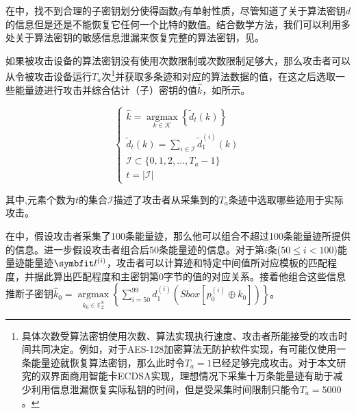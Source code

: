 {	\begin{example}
		在中，找不到合理的子密钥划分使得函数$g$有单射性质，尽管知道了关于算法密钥$d$的信息但是还是不能恢复它任何一个比特的数值。结合数学方法，我们可以利用多处关于算法密钥的敏感信息泄漏来恢复完整的算法密钥，见。
	\end{example}
	
	如果被攻击设备的算法密钥没有使用次数限制或次数限制足够大，那么攻击者可以从令被攻击设备运行$T_a$次\footnote{具体次数受算法密钥使用次数、算法实现执行速度、攻击者所能接受的攻击时间共同决定。例如，对于AES-128加密算法无防护软件实现，有可能仅使用一条能量迹就恢复算法密钥，那么此时令$T_a=1$已经足够完成攻击。对于本文研究的双界面商用智能卡ECDSA实现，理想情况下采集十万条能量迹有助于减少利用信息泄漏恢复实际私钥的时间，但是受采集时间限制只能令$T_a=5000$。}并获取多条迹和对应的算法数据的值，在这之后选取一些能量迹进行攻击并综合估计（子）密钥的值$\hat k$，如所示。
	
	\begin{equation}\label{eq:ttracek}
		\begin{cases}
			\hat k=\mathop{\mathrm{argmax}}\limits_{k\in\mathcal K}\left\lbrace \tilde d_t(k)\right\rbrace \\
			\tilde d_t(k)=\sum\limits_{i\in \mathcal I}\tilde d^{(i)}_1(k)\\
			\mathcal I\subset \{0,1,2,\dots,T_a-1\}\\
			t=\vert\mathcal I\vert
		\end{cases}
	\end{equation}
	
	\noindent 其中,元素个数为$t$的集合$\mathcal I$描述了攻击者从采集到的$T_a$条迹中选取哪些迹用于实际攻击。
	
	\begin{example}
		在中，假设攻击者采集了100条能量迹，那么他可以组合不超过100条能量迹所提供的信息。进一步假设攻击者组合后50条能量迹的信息。对于第$i$条($50\le i<100$)能量迹能量迹$\Vector {l^{(i)}}$，攻击者可以计算迹和特定中间值所对应模板的匹配程度，并据此算出匹配程度和主密钥第0字节的值的对应关系。接着他组合这些信息推断子密钥$\hat k_0=\mathop{\mathrm{argmax}}\limits_{k_0\in\mathbb F_2^8}\left\lbrace \sum\limits_{i=50}^{99}d_1^{(i)}\left( Sbox[p^{(i)}_0\oplus k_0]\right)\right\rbrace $。
	\end{example}
	
}
